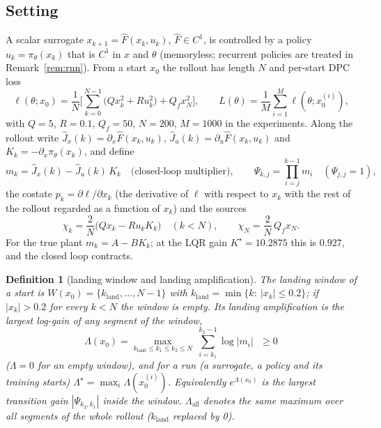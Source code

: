 \documentclass[11pt]{article}
\theoremstyle{plainnote}
\newtheorem{definition}{Definition}
\newcommand{\Jx}{\hat J_x}
\newcommand{\Ju}{\hat J_u}
\begin{document}
\subsection{Setting}
A scalar surrogate $x_{k+1}=\hat F(x_k,u_k)$, $\hat F\in C^1$, is controlled by a policy $u_k=\pi_\theta(x_k)$ that is $C^1$ in $x$ and $\theta$ (memoryless; recurrent policies are treated in Remark~\ref{rem:rnn}). From a start $x_0$ the rollout has length $N$ and per-start DPC loss
\begin{equation}
\ell(\theta;x_0)=\frac1N\Big[\sum_{k=0}^{N-1}\big(Qx_k^2+Ru_k^2\big)+Q_fx_N^2\Big],\qquad L(\theta)=\frac1M\sum_{i=1}^M\ell(\theta;x_0^{(i)}),
\end{equation}
with $Q=5$, $R=0.1$, $Q_f=50$, $N=200$, $M=1000$ in the experiments. Along the rollout write $\Jx(k)=\partial_x\hat F(x_k,u_k)$, $\Ju(k)=\partial_u\hat F(x_k,u_k)$ and $K_k=-\partial_x\pi_\theta(x_k)$, and define
\begin{equation}
m_k=\Jx(k)-\Ju(k)\,K_k\quad\text{(closed-loop multiplier)},\qquad \Psi_{k,j}=\prod_{i=j}^{k-1}m_i\quad(\Psi_{j,j}=1),
\end{equation}
the costate $p_k=\partial\ell/\partial x_k$ (the derivative of $\ell$ with respect to $x_k$ with the rest of the rollout regarded as a function of $x_k$) and the sources
\begin{equation}
\chi_k=\frac2N\big(Qx_k-Ru_kK_k\big)\quad(k<N),\qquad \chi_N=\frac2N\,Q_fx_N .
\end{equation}
For the true plant $m_k=A-BK_k$; at the LQR gain $K^\star=10.2875$ this is $0.927$, and the closed loop contracts.

\begin{definition}[landing window and landing amplification]
The landing window of a start is $W(x_0)=\{k_{\mathrm{land}},\dots,N-1\}$ with $k_{\mathrm{land}}=\min\{k:\ |x_k|\le0.2\}$; if $|x_k|>0.2$ for every $k<N$ the window is empty. Its landing amplification is the largest log-gain of any segment of the window,
\begin{equation}
\Lambda(x_0)=\max_{k_{\mathrm{land}}\le k_1\le k_2\le N}\ \sum_{i=k_1}^{k_2-1}\log|m_i|\ \ \ \ge0
\end{equation}
($\Lambda=0$ for an empty window), and for a run (a surrogate, a policy and its training starts) $\Lambda^\star=\max_i\Lambda(x_0^{(i)})$. Equivalently $e^{\Lambda(x_0)}$ is the largest transition gain $|\Psi_{k_2,k_1}|$ inside the window. $\Lambda_{\mathrm{all}}$ denotes the same maximum over all segments of the whole rollout ($k_{\mathrm{land}}$ replaced by 0).
\end{definition}
\end{document}

